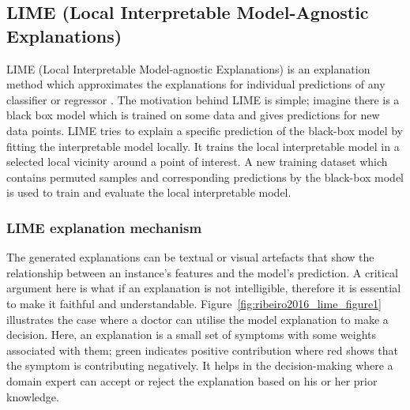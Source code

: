 \documentclass[english]{tktltiki2}
\theoremstyle{definition}
\theoremstyle{remark}
\begin{document}
\subsection{ LIME (Local Interpretable Model-Agnostic Explanations)}\label{sec:LIME} %
LIME (Local Interpretable Model-agnostic Explanations) is an explanation method which approximates the explanations for individual predictions of any classifier or regressor \citep{ribeiro2016should}. The motivation behind LIME is simple; imagine there is a black box model which is trained on some data and gives predictions for new data points. LIME tries to explain a specific prediction of the black-box model by fitting the interpretable model locally. It trains the local interpretable model in a selected local vicinity around a point of interest. A new training dataset which contains permuted samples and corresponding predictions by the black-box model is used to train and evaluate the local interpretable model. 

\subsubsection{LIME explanation mechanism} %
The generated explanations can be textual or visual artefacts that show the relationship between an instance's features and the model's prediction. A critical argument here is what if an explanation is not intelligible, therefore it is essential to make it faithful and understandable. Figure~\ref{fig:ribeiro2016_lime_figure1} illustrates the case where a doctor can utilise the model explanation to make a decision. Here, an explanation is a small set of symptoms with some weights associated with them; green indicates positive contribution where red shows that the symptom is contributing negatively. It helps in the decision-making where a domain expert can accept or reject the explanation based on his or her prior knowledge.
\end{document}
